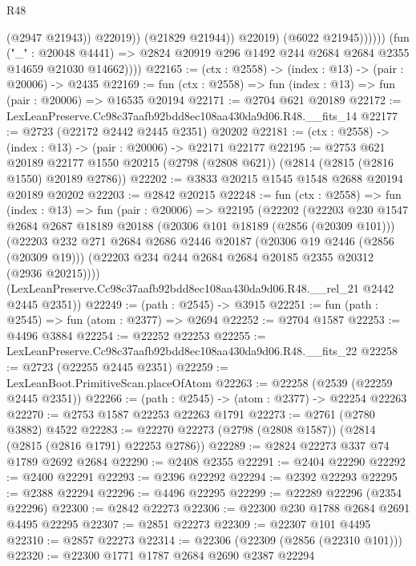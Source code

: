 \begin{lexlean}{R48}
\begin{coremodule}
                              (@2947 @21943))
                            @22019))
                        (@21829 @21944))
                      @22019)
                    (@6022 @21945))))))
          (fun ("_" : @20048 @4441) =>
          @2824 @20919 @296 @1492 @244 @2684 @2684 @2355 @14659 @21030 @14662))))
@22165 := (ctx : @2558) -> (index : @13) -> (pair : @20006) -> @2435
@22169 := fun (ctx : @2558) => fun (index : @13) => fun (pair : @20006) => @16535 @20194
@22171 := @2704 @621 @20189
@22172 := LexLeanPreserve.Cc98c37aafb92bdd8ec108aa430da9d06.R48.__fits_14
@22177 := @2723 (@22172 @2442 @2445 @2351) @20202
@22181 := (ctx : @2558) -> (index : @13) -> (pair : @20006) -> @22171 @22177
@22195 := @2753
    @621
    @20189
    @22177
    @1550
    @20215
    (@2798 (@2808 @621))
    (@2814 (@2815 (@2816 @1550) @20189 @2786))
@22202 := @3833 @20215 @1545 @1548 @2688 @20194 @20189 @20202
@22203 := @2842 @20215
@22248 := fun (ctx : @2558) =>
  fun (index : @13) =>
  fun (pair : @20006) =>
  @22195
    (@22202
      (@22203
        @230
        @1547
        @2684
        @2687
        @18189
        @20188
        (@20306 @101 @18189 (@2856 (@20309 @101)))
        (@22203
          @232
          @271
          @2684
          @2686
          @2446
          @20187
          (@20306 @19 @2446 (@2856 (@20309 @19)))
          (@22203 @234 @244 @2684 @2684 @20185 @2355 @20312 (@2936 @20215))))
      (LexLeanPreserve.Cc98c37aafb92bdd8ec108aa430da9d06.R48.__rel_21 @2442 @2445 @2351))
@22249 := (path : @2545) -> @3915
@22251 := fun (path : @2545) => fun (atom : @2377) => @2694
@22252 := @2704 @1587
@22253 := @4496 @3884
@22254 := @22252 @22253
@22255 := LexLeanPreserve.Cc98c37aafb92bdd8ec108aa430da9d06.R48.__fits_22
@22258 := @2723 (@22255 @2445 @2351)
@22259 := LexLeanBoot.PrimitiveScan.placeOfAtom
@22263 := @22258 (@2539 (@22259 @2445 @2351))
@22266 := (path : @2545) -> (atom : @2377) -> @22254 @22263
@22270 := @2753 @1587 @22253 @22263 @1791
@22273 := @2761 (@2780 @3882) @4522
@22283 := @22270 @22273 (@2798 (@2808 @1587)) (@2814 (@2815 (@2816 @1791) @22253 @2786))
@22289 := @2824 @22273 @337 @74 @1789 @2692 @2684
@22290 := @2408 @2355
@22291 := @2404 @22290
@22292 := @2400 @22291
@22293 := @2396 @22292
@22294 := @2392 @22293
@22295 := @2388 @22294
@22296 := @4496 @22295
@22299 := @22289 @22296 (@2354 @22296)
@22300 := @2842 @22273
@22306 := @22300 @230 @1788 @2684 @2691 @4495 @22295
@22307 := @2851 @22273
@22309 := @22307 @101 @4495
@22310 := @2857 @22273
@22314 := @22306 (@22309 (@2856 (@22310 @101)))
@22320 := @22300 @1771 @1787 @2684 @2690 @2387 @22294

\end{coremodule}
\end{lexlean}
